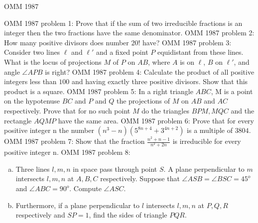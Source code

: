 OMM 1987 

OMM 1987 problem 1:  Prove that if the sum of two irreducible fractions is an integer then the two fractions have the same denominator. 
OMM 1987 problem 2:  How many positive divisors does number $20!$ have? 
OMM 1987 problem 3:  Consider two lines $\ell$ and $\ell ' $ and a fixed point $P$ equidistant from these lines. What is the locus of projections $M$ of $P$ on $AB$, where $A$ is on  $\ell $, $B$ on  $\ell ' $, and angle $\angle APB$ is right? 
OMM 1987 problem 4:  Calculate the product of all positive integers less than $100$ and having exactly three positive divisors. Show that this product is a square. 
OMM 1987 problem 5:  In a right triangle $ABC$, M is a point on the hypotenuse $BC$ and $P$ and $Q$ the projections of $M$ on $AB$ and $AC$ respectively. Prove that for no such point $M$ do the triangles $BPM, MQC$ and the rectangle $AQMP$ have the same area. 
OMM 1987 problem 6:  Prove that for every positive integer n the number $(n^3 -n)(5^{8n+4} +3^{4n+2})$ is a multiple of $3804$. 
OMM 1987 problem 7:  Show that the fraction $ \frac{n^2+n-1}{n^2+2n}$ is irreducible for every positive integer n. 
OMM 1987 problem 8:  \begin{enumerate}[(a)]
  \item Three lines $l,m,n$ in space pass through point $S$. A plane perpendicular to $m$ intersects $l,m,n $ at $A,B,C$ respectively. Suppose that $\angle ASB = \angle BSC = 45^o$ and $\angle ABC = 90^o$. Compute $\angle ASC$.
  \item Furthermore, if a plane perpendicular to $l$ intersects  $l,m,n$  at $P,Q,R$ respectively and $SP = 1$, find the sides of triangle $PQR$.
\end{enumerate} 
